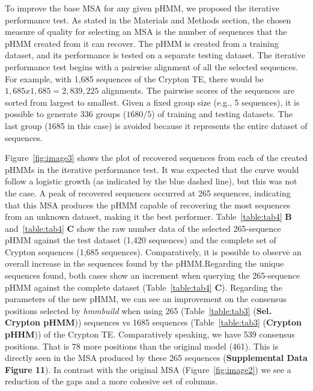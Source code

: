 \documentclass[unnumsec,webpdf,contemporary,large]{oup-authoring-template}%
\theoremstyle{thmstyleone}%
\theoremstyle{thmstyletwo}%
\theoremstyle{thmstylethree}%
\begin{document}
To improve the base MSA for any given pHMM, we proposed the iterative
performance test. As stated in the Materials and Methods section, the chosen
measure of quality for selecting an MSA is the number of sequences that the pHMM
created from it can recover. The pHMM is created from a training dataset, and
its performance is tested on a separate testing dataset. The iterative
performance test begins with a pairwise alignment of all the selected sequences.
For example, with 1,685 sequences of the Crypton TE, there would be $1,685 x
1,685 = 2,839,225$ alignments. The pairwise scores of the sequences are sorted
from largest to smallest. Given a fixed group size (e.g., 5 sequences), it is
possible to generate 336 groups ($1680/5$) of training and testing datasets. The
last group (1685 in this case) is avoided because it represents the entire
dataset of sequences.

Figure~\ref{fig:image3} shows the plot of recovered sequences from each of the
created pHMMs in the iterative performance test. It was expected that the curve
would follow a logistic growth (as indicated by the blue dashed line), but this
was not the case. A peak of recovered sequences occurred at 265 sequences,
indicating that this MSA produces the pHMM capable of recovering the most
sequences from an unknown dataset, making it the best performer.
Table~\ref{table:tab4} \textbf{B} and~\ref{table:tab4} \textbf{C} show the raw
number data of the selected 265-sequence pHMM against the test dataset (1,420
sequences) and the complete set of Crypton sequences (1,685 sequences).
Comparatively, it is possible to observe an overall increase in the sequences
found by the pHMM.\@ Regarding the unique sequences found, both cases show an
increment when querying the 265-sequence pHMM against the complete dataset
(Table~\ref{table:tab4} \textbf{C}). Regarding the parameters of the new pHMM,
we can see an improvement on the consensus positions selected by
\textit{hmmbuild} when using 265 (Table~\ref{table:tab3} (\textbf{Sel. Crypton
pHMM})) sequences vs 1685 sequences (Table~\ref{table:tab3} (\textbf{Crypton
pHHM})) of the Crypton TE\@. Comparatively speaking, we have 539 consensus
positions. That is 78 more positions than the original model (461). This is
directly seen in the MSA produced by these 265 sequences (\textbf{Supplemental
Data Figure 11}). In contrast with the original MSA (Figure~\ref{fig:image2}) we
see a reduction of the gaps and a more cohesive set of columns.
\end{document}
